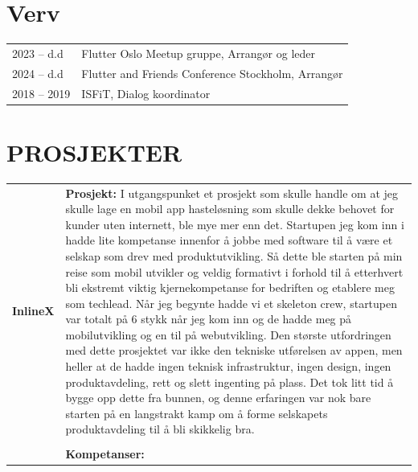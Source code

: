 \documentclass[a4paper,10pt]{article}
\begin{document}
\section{Verv}
\begin{tabularx}{\linewidth}{@{}lX@{}}
2023 -- d.d & Flutter Oslo Meetup gruppe, Arrangør og leder \\
2024 -- d.d & Flutter and Friends Conference Stockholm, Arrangør \\
2018 -- 2019 & ISFiT, Dialog koordinator \\
\end{tabularx}
\vspace{1em}

\section{{\Huge \ubuntu PROSJEKTER}}

\noindent
\begin{tabular}{@{}p{4cm}p{11cm}@{}}  %
\textbf{InlineX} & \textbf{Prosjekt:} I utgangspunket et prosjekt som skulle handle om at jeg skulle lage en mobil app hasteløsning som skulle dekke behovet for kunder uten internett, ble mye mer enn det. Startupen jeg kom inn i hadde lite kompetanse innenfor å jobbe med software til å være et selskap som drev med produktutvikling. Så dette ble starten på min reise som mobil utvikler og veldig formativt i forhold til å etterhvert bli ekstremt viktig kjernekompetanse for bedriften og etablere meg som techlead. Når jeg begynte hadde vi et skeleton crew, startupen var totalt på 6 stykk når jeg kom inn og de hadde meg på mobilutvikling og en til på webutvikling. Den største utfordringen med dette prosjektet var ikke den tekniske utførelsen av appen, men heller at de hadde ingen teknisk infrastruktur, ingen design, ingen produktavdeling, rett og slett ingenting på plass. Det tok litt tid å bygge opp dette fra bunnen, og denne erfaringen var nok bare starten på en langstrakt kamp om å forme selskapets produktavdeling til å bli skikkelig bra.   \\
& \\
& \textbf{Kompetanser:}  \\
\end{tabular}


 
\vspace{2em}
\end{document}
